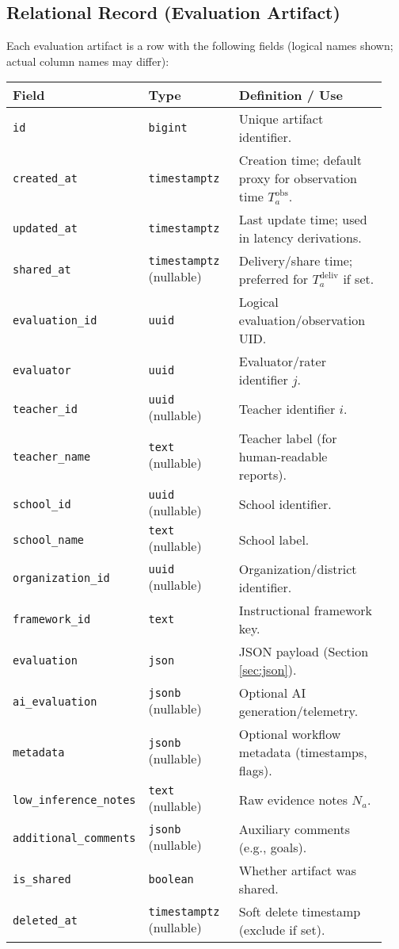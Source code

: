 \documentclass[11pt]{article}
\begin{document}
\subsection{Relational Record (Evaluation Artifact)}
Each evaluation artifact is a row with the following fields (logical names shown; actual column names may differ):
\begin{longtable}{@{}p{0.28\linewidth}p{0.25\linewidth}p{0.41\linewidth}@{}}
\toprule
\textbf{Field} & \textbf{Type} & \textbf{Definition / Use} \\
\midrule
\endhead
\texttt{id} & \texttt{bigint} & Unique artifact identifier. \\
\texttt{created\_at} & \texttt{timestamptz} & Creation time; default proxy for observation time $T^{\mathrm{obs}}_a$. \\
\texttt{updated\_at} & \texttt{timestamptz} & Last update time; used in latency derivations. \\
\texttt{shared\_at} & \texttt{timestamptz} (nullable) & Delivery/share time; preferred for $T^{\mathrm{deliv}}_a$ if set. \\
\texttt{evaluation\_id} & \texttt{uuid} & Logical evaluation/observation UID. \\
\texttt{evaluator} & \texttt{uuid} & Evaluator/rater identifier $j$. \\
\texttt{teacher\_id} & \texttt{uuid} (nullable) & Teacher identifier $i$. \\
\texttt{teacher\_name} & \texttt{text} (nullable) & Teacher label (for human-readable reports). \\
\texttt{school\_id} & \texttt{uuid} (nullable) & School identifier. \\
\texttt{school\_name} & \texttt{text} (nullable) & School label. \\
\texttt{organization\_id} & \texttt{uuid} (nullable) & Organization/district identifier. \\
\texttt{framework\_id} & \texttt{text} & Instructional framework key. \\
\texttt{evaluation} & \texttt{json} & JSON payload (Section \ref{sec:json}). \\
\texttt{ai\_evaluation} & \texttt{jsonb} (nullable) & Optional AI generation/telemetry. \\
\texttt{metadata} & \texttt{jsonb} (nullable) & Optional workflow metadata (timestamps, flags). \\
\texttt{low\_inference\_notes} & \texttt{text} (nullable) & Raw evidence notes $N_a$. \\
\texttt{additional\_comments} & \texttt{jsonb} (nullable) & Auxiliary comments (e.g., goals). \\
\texttt{is\_shared} & \texttt{boolean} & Whether artifact was shared. \\
\texttt{deleted\_at} & \texttt{timestamptz} (nullable) & Soft delete timestamp (exclude if set). \\
\bottomrule
\end{longtable}
\end{document}
